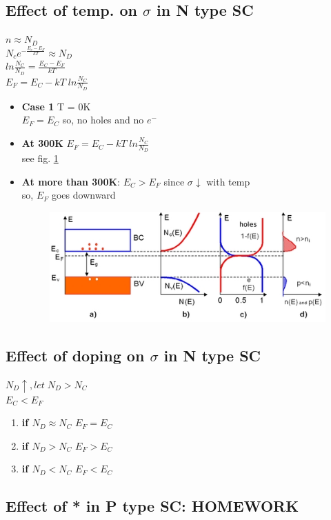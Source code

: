 \documentclass[10pt, a4paper]{report}
\begin{document}
	\subsection{Effect of temp. on $ \sigma $ in N type SC}
	$ n \approx N_D $ \\
	$ N_c  e^{-\frac{E_c-E_F}{kT}}  \approx N_D$ \\
	$ ln\frac{N_C}{N_D}  = \frac{E_C - E_F}{kT}$ \\
	$ E_F = E_C - kT\; ln \frac{N_C}{N_D} $
	\begin{itemize}
		\item \textbf{Case 1} T = 0K \\
		$ E_F = E_C $ so, no holes and no $ e^- $
		\item \textbf{At 300K} $ E_F = E_C - k T\; ln \frac{N_C}{N_D} $ \\
		see fig. \ref{fig:fermilvlntype}
		\item \textbf{At more than 300K}: $ E_C > E_F $ since $\sigma$$\downarrow$ with temp \\
		so, $ E_F $ goes downward
		\begin{figure}
			\centering
			\includegraphics[width=0.7\linewidth]{img/fermi_lvl_ntype}
			\caption{}
			\label{fig:fermilvlntype}
		\end{figure}
	\end{itemize}
	\subsection{Effect of doping on $ \sigma $ in N type SC}
	$ N_D \uparrow, let \; N_D > N_C $\\
	$ E_C < E_F $
	\begin{enumerate}
		\item \textbf{if $ N_D \approx N_C $} $ E_F = E_C $
		\item \textbf{if $ N_D > N_C $} $ E_F > E_C $
		\item \textbf{if $ N_D < N_C $} $ E_F < E_C $
	\end{enumerate}
	\subsection{Effect of * in P type SC: HOMEWORK}
	
\end{document}

